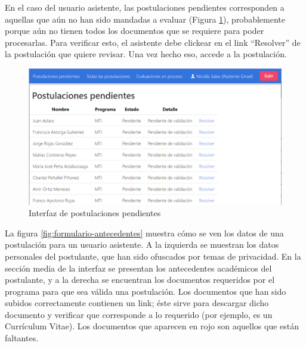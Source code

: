 En el caso del usuario asistente, las postulaciones pendientes corresponden a
aquellas que aún no han sido mandadas a evaluar (Figura
\ref{fig:interfaz-pendientes}), probablemente porque aún no tienen todos los
documentos que se requiere para poder procesarlas. Para verificar esto, el
asistente debe clickear en el link “Resolver” de la postulación que quiere
revisar. Una vez hecho eso, accede a la postulación.

\begin{figure}[!ht]
    \begin{center}
        \includegraphics[scale=0.23]{imagenes/04-interfaz-pendientes.png}
    \end{center}
    \caption{Interfaz de postulaciones pendientes}
    \label{fig:interfaz-pendientes}
\end{figure}

La figura \ref{fig:formulario-antecedentes} muestra cómo se ven los datos de una
postulación para un usuario asistente. A la izquierda se muestran los datos
personales del postulante, que han sido ofuscados por temas de privacidad. En la
sección media de la interfaz se presentan los antecedentes académicos del
postulante, y a la derecha se encuentran los documentos requeridos por el
programa para que sea válida una postulación. Los documentos que han sido
subidos correctamente contienen un link; éste sirve para descargar dicho
documento y verificar que corresponde a lo requerido (por ejemplo, es un
Currículum Vitae). Los documentos que aparecen en rojo son aquellos que están
faltantes.

